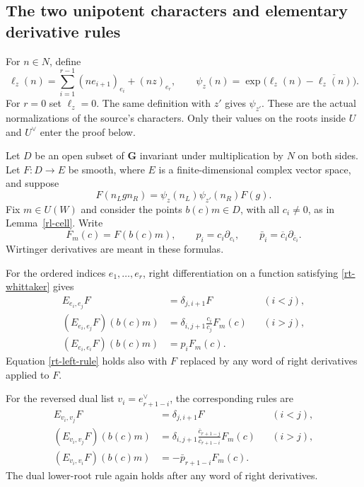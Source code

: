 \subsection{The two unipotent characters and elementary derivative rules}

For $n\in N$, define
\[
 \ell_z(n)=
 \sum_{i=1}^{r-1}(ne_{i+1})_{e_i}+(nz)_{e_r},
 \qquad
 \psi_z(n)=\exp\bigl(\ell_z(n)-\overline{\ell_z(n)}\bigr).
\]
For $r=0$ set $\ell_z=0$.
The same definition with $z'$ gives $\psi_{z'}$.
These are the actual normalizations of the source's
characters.  Only their values on the roots inside
$U$ and $U^\vee$ enter the proof below.

Let $D$ be an open subset of $\mathbf G$ invariant
under multiplication by $N$ on both sides.
Let $F:D\to E$ be smooth, where $E$ is a
finite-dimensional complex vector space, and suppose
\begin{equation}\label{rt-whittaker}
 F(n_Lgn_R)=\psi_z(n_L)\psi_{z'}(n_R)F(g).
\end{equation}
Fix $m\in U(W)$ and consider the points $b(c)m\in D$,
with all $c_i\ne0$, as in Lemma~\ref{rl-cell}.
Write
\[
 F_m(c)=F(b(c)m),\qquad
 p_i=c_i\partial_{c_i},\qquad
 \bar p_i=\overline c_i\partial_{\overline c_i}.
\]
Wirtinger derivatives are meant in these formulas.

\begin{lemma}\label{rt-root-rules}
For the ordered indices $e_1,\ldots,e_r$,
right differentiation on a function satisfying
\eqref{rt-whittaker} gives
\begin{align}
 E_{e_i,e_j}F&=\delta_{j,i+1}F
                                      &&(i<j),\label{rt-right-rule}\\
 (E_{e_i,e_j}F)(b(c)m)
       &=\delta_{i,j+1}\frac{c_i}{c_j}F_m(c)
                                      &&(i>j),\label{rt-left-rule}\\
 (E_{e_i,e_i}F)(b(c)m)&=p_iF_m(c).
                                                   \label{rt-torus-rule}
\end{align}
Equation \eqref{rt-left-rule} holds also with $F$
replaced by any word of right derivatives applied
to $F$.

For the reversed dual list
$v_i=e_{r+1-i}^\vee$, the corresponding rules are
\begin{align}
 E_{v_i,v_j}F&=\delta_{j,i+1}F&&(i<j),\label{rt-dual-right}\\
 (E_{v_i,v_j}F)(b(c)m)
   &=\delta_{i,j+1}
       \frac{\overline c_{r+1-j}}{\overline c_{r+1-i}}
         F_m(c)&&(i>j),\label{rt-dual-left}\\
 (E_{v_i,v_i}F)(b(c)m)
   &=-\bar p_{r+1-i}F_m(c).\label{rt-dual-torus}
\end{align}
The dual lower-root rule again holds after any
word of right derivatives.
\end{lemma}

